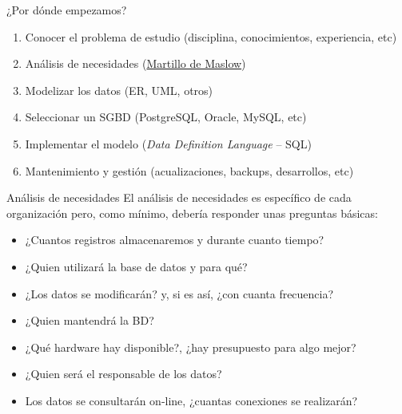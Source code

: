 \documentclass{classes/beamer_GeomaticaUA}
\begin{document}
\begin{frame}{¿Por dónde empezamos?}
\begin{enumerate}
\item Conocer el problema de estudio (disciplina, conocimientos, experiencia, etc)
\item Análisis de necesidades (\href{http://es.wikipedia.org/wiki/Martillo_de_oro}{Martillo de Maslow})
\item Modelizar los datos (ER, UML, otros)
\item Seleccionar un SGBD (PostgreSQL, Oracle, MySQL, etc)
\item Implementar el modelo (\textit{Data Definition Language} -- SQL)
\item Mantenimiento y gestión (acualizaciones, backups, desarrollos, etc)
\end{enumerate}
\end{frame}

\begin{frame}{Análisis de necesidades}
El análisis de necesidades es específico de cada organización pero, como mínimo, debería responder unas preguntas básicas:

\begin{itemize}
\item ¿Cuantos registros almacenaremos y durante cuanto tiempo?
\item ¿Quien utilizará la base de datos y para qué?
\item ¿Los datos se modificarán? y, si es así, ¿con cuanta frecuencia?
\item ¿Quien mantendrá la BD?
\item ¿Qué hardware hay disponible?, ¿hay presupuesto para algo mejor?
\item ¿Quien será el responsable de los datos?
\item Los datos se consultarán on-line, ¿cuantas conexiones se realizarán?
\end{itemize}
\end{frame}
\end{document}

